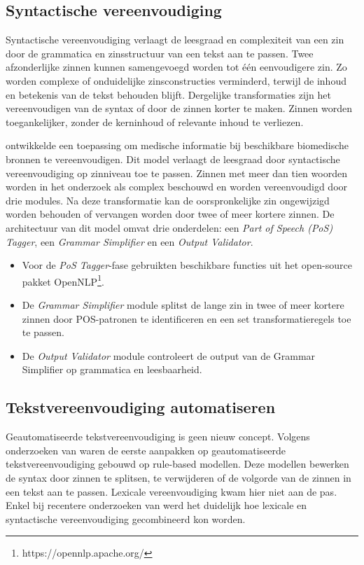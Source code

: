 
\subsection{Syntactische vereenvoudiging}

Syntactische vereenvoudiging verlaagt de leesgraad en complexiteit van een zin door de grammatica en zinsstructuur van een tekst aan te passen. Twee afzonderlijke zinnen kunnen samengevoegd worden tot één eenvoudigere zin. Zo worden complexe of onduidelijke zinsconstructies verminderd, terwijl de inhoud en betekenis van de tekst behouden blijft. Dergelijke transformaties zijn het vereenvoudigen van de syntax of door de zinnen korter te maken. Zinnen worden toegankelijker, zonder de kerninhoud of relevante inhoud te verliezen.

\textcite{Kandula2010} ontwikkelde een toepassing om medische informatie bij beschikbare biomedische bronnen te vereenvoudigen. Dit model verlaagt de leesgraad door syntactische vereenvoudiging op zinniveau toe te passen. Zinnen met meer dan tien woorden worden in het onderzoek als complex beschouwd en worden vereenvoudigd door drie modules. Na deze transformatie kan de oorspronkelijke zin ongewijzigd worden behouden of vervangen worden door twee of meer kortere zinnen. De architectuur van dit model omvat drie onderdelen: een \textit{Part of Speech (PoS) Tagger}, een \textit{Grammar Simplifier} en een \textit{Output Validator}. 

\begin{itemize}
	\item Voor de \textit{PoS Tagger}-fase gebruikten \textcite{Kandula2010} beschikbare functies uit het open-source pakket OpenNLP\footnote{https://opennlp.apache.org/}.
	\item De \textit{Grammar Simplifier} module splitst de lange zin in twee of meer kortere zinnen door POS-patronen te identificeren en een set transformatieregels toe te passen.
	\item De \textit{Output Validator} module controleert de output van de Grammar Simplifier op grammatica en leesbaarheid.
\end{itemize}  

\subsection{Tekstvereenvoudiging automatiseren}

Geautomatiseerde tekstvereenvoudiging is geen nieuw concept. Volgens onderzoeken van \textcite{Canning2000, Siddharthan2006} waren de eerste aanpakken op geautomatiseerde tekstvereenvoudiging gebouwd op rule-based modellen. Deze modellen bewerken de syntax door zinnen te splitsen, te verwijderen of de volgorde van de zinnen in een tekst aan te passen. Lexicale vereenvoudiging kwam hier niet aan de pas. Enkel bij recentere onderzoeken van \textcite{Coster2011, Bulte2018} werd het duidelijk hoe lexicale en syntactische vereenvoudiging gecombineerd kon worden.

